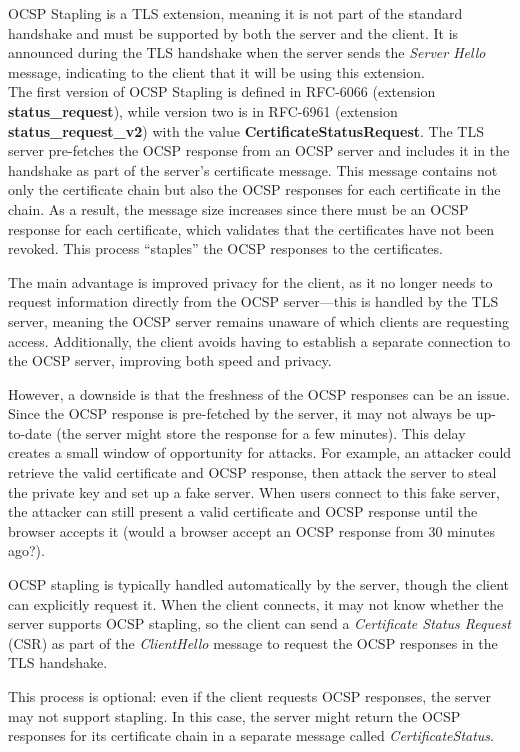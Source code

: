 OCSP Stapling is a TLS extension, meaning it is not part of the
standard handshake and must be supported by both the server and the
client. It is announced during the TLS handshake when the server sends
the \textit{Server Hello} message, indicating to the client that it
will be using this extension.\\
The first version of OCSP Stapling is defined in RFC-6066 (extension
\textbf{status\_request}), while version two is in RFC-6961 (extension
\textbf{status\_request\_v2}) with the value
\textbf{CertificateStatusRequest}. The TLS server pre-fetches the OCSP
response from an OCSP server and includes it in the handshake as part
of the server's certificate message. This message contains not only
the certificate chain but also the OCSP responses for each certificate
in the chain. As a result, the message size increases since there must
be an OCSP response for each certificate, which validates that the
certificates have not been revoked. This process ``staples'' the OCSP
responses to the certificates.

The main advantage is improved privacy for the client, as it no longer
needs to request information directly from the OCSP server—this is
handled by the TLS server, meaning the OCSP server remains unaware of
which clients are requesting access. Additionally, the client avoids
having to establish a separate connection to the OCSP server,
improving both speed and privacy.

However, a downside is that the freshness of the OCSP responses can be
an issue. Since the OCSP response is pre-fetched by the server, it may
not always be up-to-date (the server might store the response for a
few minutes). This delay creates a small window of opportunity for
attacks. For example, an attacker could retrieve the valid certificate
and OCSP response, then attack the server to steal the private key and
set up a fake server. When users connect to this fake server, the
attacker can still present a valid certificate and OCSP response until
the browser accepts it (would a browser accept an OCSP response from
30 minutes ago?).

OCSP stapling is typically handled automatically by the server, though
the client can explicitly request it. When the client connects, it may
not know whether the server supports OCSP stapling, so the client can
send a \textit{Certificate Status Request} (CSR) as part of the
\textit{ClientHello} message to request the OCSP responses in the TLS
handshake.

This process is optional: even if the client requests OCSP responses,
the server may not support stapling. In this case, the server might
return the OCSP responses for its certificate chain in a separate
message called \textit{CertificateStatus}.

